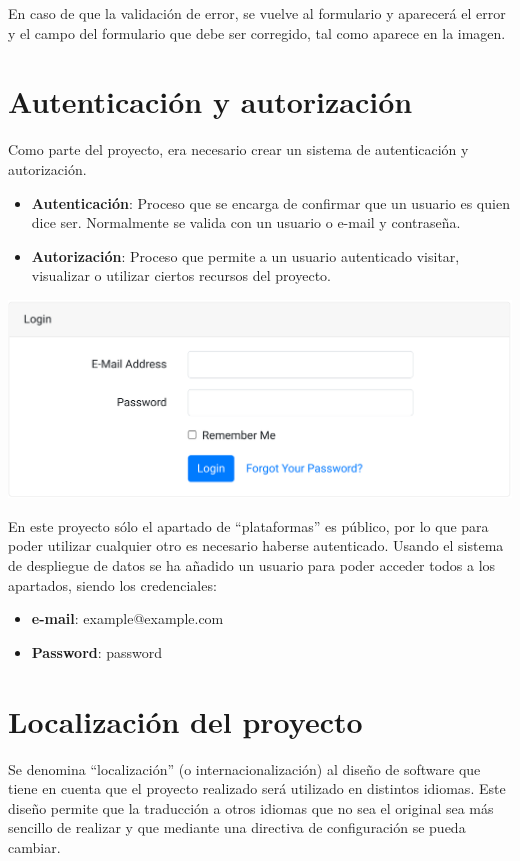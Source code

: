 \documentclass{\ClassPath/viu-tfm-template}
\begin{document}
En caso de que la validación de error, se vuelve al formulario y aparecerá el error y el campo del formulario que debe ser corregido, tal como aparece en la imagen.

\section{Autenticación y autorización}
Como parte del proyecto, era necesario crear un sistema de autenticación y autorización.

\vspace{-1em}
\begin{itemize}
    \item \textbf{Autenticación}: Proceso que se encarga de confirmar que un usuario es quien dice ser. Normalmente se valida con un usuario o e-mail y contraseña.
    \item \textbf{Autorización}: Proceso que permite a un usuario autenticado visitar, visualizar o utilizar ciertos recursos del proyecto.
\end{itemize}
\vspace{-1em}

\begin{center}
    \includegraphics[width=0.5\linewidth]{img/login.png}
\end{center}

En este proyecto sólo el apartado de “plataformas” es público, por lo que para poder utilizar cualquier otro es necesario haberse autenticado. Usando el sistema de despliegue de datos se ha añadido un usuario para poder acceder todos a los apartados, siendo los credenciales:

\vspace{-1em}
\begin{itemize}
    \item \textbf{e-mail}: example@example.com
    \item \textbf{Password}: password
\end{itemize}
\vspace{-1em}



\section{Localización del proyecto}
Se denomina “localización” (o internacionalización) al diseño de software que tiene en cuenta que el proyecto realizado será utilizado en distintos idiomas. Este diseño permite que la traducción a otros idiomas que no sea el original sea más sencillo de realizar y que mediante una directiva de configuración se pueda cambiar.
\end{document}
